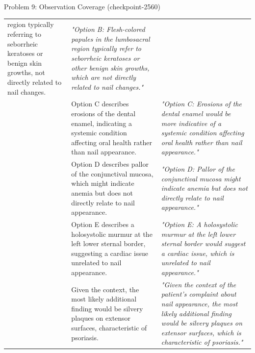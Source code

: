 \documentclass{beamer}
\newcommand{\cmark}{\textcolor{green!60!black}{\ding{51}}}
\begin{document}
\begin{frame}[allowframebreaks]{Problem 9: Observation Coverage (checkpoint-2560)}
\begin{tabularx}{\textwidth}{>{\centering\arraybackslash}p{0.9cm} X p{4.5cm}}
region typically referring to seborrheic keratoses or benign
skin growths, not directly related to nail changes. & \small\itshape "Option B: Flesh-colored papules in the
lumbosacral region typically refer to
seborrheic keratoses or other benign
skin growths, which are not directly
related to nail changes." \\
      \cmark & \small Option C describes erosions of the dental enamel, indicating
a systemic condition affecting oral health rather than nail
appearance. & \small\itshape "Option C: Erosions of the dental enamel
would be more indicative of a systemic
condition affecting oral health rather
than nail appearance." \\
      \cmark & \small Option D describes pallor of the conjunctival mucosa, which
might indicate anemia but does not directly relate to nail
appearance. & \small\itshape "Option D: Pallor of the conjunctival
mucosa might indicate anemia but does
not directly relate to nail appearance." \\
      \cmark & \small Option E describes a holosystolic murmur at the left lower
sternal border, suggesting a cardiac issue unrelated to nail
appearance. & \small\itshape "Option E: A holosystolic murmur at the
left lower sternal border would suggest
a cardiac issue, which is unrelated to
nail appearance." \\
      \cmark & \small Given the context, the most likely additional finding would
be silvery plaques on extensor surfaces, characteristic of
psoriasis. & \small\itshape "Given the context of the patient's
complaint about nail appearance, the
most likely additional finding would be
silvery plaques on extensor surfaces,
which is characteristic of psoriasis." \\
    \bottomrule
    \end{tabularx}
\end{frame}
\end{document}
